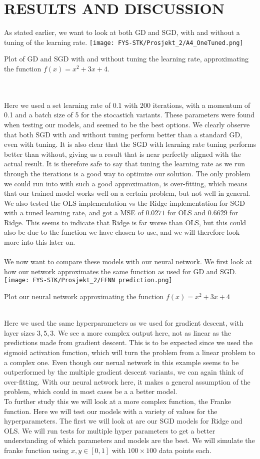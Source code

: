 \documentclass[english,notitlepage,reprint,nofootinbib]{revtex4-1}  %
\begin{document}
\section{RESULTS AND DISCUSSION}\label{sec:DISCUSSION}
As stated earlier, we want to look at both GD and SGD, with and without a tuning of the learning rate. 
\texttt{[image: FYS-STK/Prosjekt\_2/A4\_OneTuned.png]}
\caption{Plot of GD and SGD with and without tuning the learning rate, approximating the function $f(x) = x^2 + 3x + 4$.}
\\
\\
Here we used a set learning rate of $0.1$ with 200 iterations, with a momentum of 0.1 and a batch size of 5 for the stocastich variants. These parameters were found when testing our models, and seemed to be the best options. We clearly observe that both SGD with and without tuning perform better than a standard GD, even with tuning. It is also clear that the SGD with learning rate tuning performs better than without, giving us a result that is near perfectly aligned with the actual result. It is therefore safe to say that tuning the learning rate as we run through the iterations is a good way to optimize our solution. The only problem we could run into with such a good approximation, is over-fitting, which means that our trained model works well on a certain problem, but not well in general. We also tested the OLS implementation vs the Ridge implementation for SGD with a tuned learning rate, and got a MSE of $0.0271$ for OLS and $0.6629$ for Ridge. This seems to indicate that Ridge is far worse than OLS, but this could also be due to the function we have chosen to use, and we will therefore look more into this later on.
\\
\\
We now want to compare these models with our neural network. We first look at how our network approximates the same function as used for GD and SGD.
\texttt{[image: FYS-STK/Prosjekt\_2/FFNN prediction.png]}
\caption{Plot our neural network approximating the function $f(x) = x^2 + 3x + 4$}
\\
Here we used the same hyperparameters as we used for gradient descent, with layer sizes $3,5,3$. We see a more complex output here, not as linear as the predictions made from gradient descent. This is to be expected since we used the sigmoid activation function, which will turn the problem from a linear problem to a complex one. Even though our nerual network in this example seems to be outperformed by the multiple gradient descent variants, we can again think of over-fitting. With our neural network here, it makes a general assumption of the problem, which could in most cases be a a better model.
\\
To further study this we will look at a more complex function, the Franke function. Here we will test our models with a variety of values for the hyperparameters. The first we will look at are our SGD models for Ridge and OLS. We will run tests for multiple hyper parameters to get a better understanding of which parameters and models are the best. We will simulate the franke function using $x,y \in [0,1]$ with $100 \times 100$ data points each.
\end{document}
